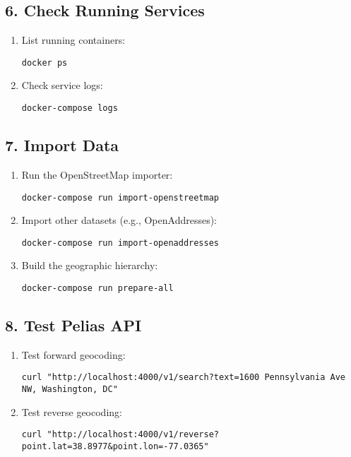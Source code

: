 \documentclass{article}
\begin{document}
\subsection*{6. Check Running Services}
\begin{enumerate}
    \item List running containers:
    \begin{lstlisting}
docker ps
    \end{lstlisting}
    \item Check service logs:
    \begin{lstlisting}
docker-compose logs
    \end{lstlisting}
\end{enumerate}

\subsection*{7. Import Data}
\begin{enumerate}
    \item Run the OpenStreetMap importer:
    \begin{lstlisting}
docker-compose run import-openstreetmap
    \end{lstlisting}
    \item Import other datasets (e.g., OpenAddresses):
    \begin{lstlisting}
docker-compose run import-openaddresses
    \end{lstlisting}
    \item Build the geographic hierarchy:
    \begin{lstlisting}
docker-compose run prepare-all
    \end{lstlisting}
\end{enumerate}

\subsection*{8. Test Pelias API}
\begin{enumerate}
    \item Test forward geocoding:
    \begin{lstlisting}
curl "http://localhost:4000/v1/search?text=1600 Pennsylvania Ave NW, Washington, DC"
    \end{lstlisting}
    \item Test reverse geocoding:
    \begin{lstlisting}
curl "http://localhost:4000/v1/reverse?point.lat=38.8977&point.lon=-77.0365"
    \end{lstlisting}
\end{enumerate}
\end{document}

